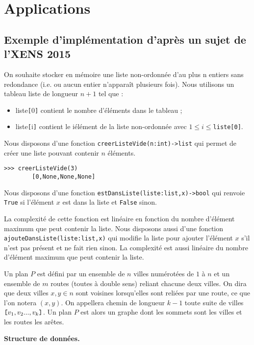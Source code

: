 \section{Applications}

\subsection{Exemple d'implémentation d'après un sujet de l'XENS 2015}
On souhaite stocker en mémoire une liste non-ordonnée d'au plus n entiers sans redondance (i.e. ou aucun entier n'apparaît
plusieurs fois). Nous utilisons un tableau 
liste de longueur $n+1$ tel que :
\begin{itemize}
\item liste\verb![!0\verb!]! contient le nombre d'éléments dans le tableau ;
\item liste\verb![!i\verb!]! contient le i\ieme élément de la liste non-ordonnée avec $1\leqslant i \leqslant $\texttt{liste[0]}.
\end{itemize}
Nous disposons d'une fonction \texttt{creerListeVide(n:int)->list} qui permet de créer une liste pouvant contenir $n$ éléments.

\begin{lstlisting}
>>> creerListeVide(3)
        [0,None,None,None]
\end{lstlisting}

Nous disposons d'une fonction \texttt{estDansListe(liste:list,x)->bool} qui renvoie \texttt{True} si l'élément $x$ est dans la liste et \texttt{False} sinon.

La complexité de cette fonction est linéaire en fonction du nombre d'élément maximum que peut contenir la liste. 
Nous disposons aussi d'une fonction \texttt{ajouteDansListe(liste:list,x)} qui modifie la liste pour ajouter l'élément $x$ s'il n'est pas présent et ne fait rien sinon. La complexité est aussi linéaire du nombre d'élément maximum que peut contenir la liste.

Un plan $P$ est défini par un ensemble de $n$ villes numérotées de $1$ à $n$ et un ensemble de $m$ routes (toutes à double sens)
reliant chacune deux villes. On dira que deux villes $x, y \in  n$ sont voisines lorsqu'elles sont reliées par une route, ce que l'on notera $(x, y)$. On appellera chemin de longueur $k-1$ toute suite de villes $\verb![!v_1, v_2 ... , v_k\verb!]!$. Un plan $P$ est alors un graphe dont les sommets sont les villes et les routes les arêtes.

\textbf{Structure de données. } 

